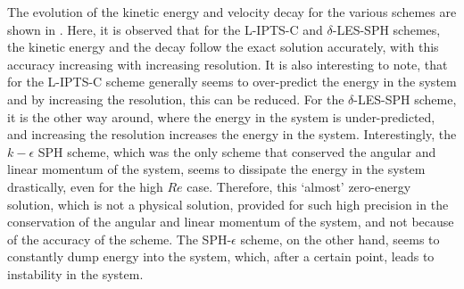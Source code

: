 The evolution of the kinetic energy and velocity decay for the various schemes are shown in . 
Here, it is observed that for the L-IPTS-C and $\delta$-LES-SPH schemes, the kinetic energy and the decay follow the exact solution accurately, with this accuracy increasing with increasing resolution. It is also interesting to note, that for the L-IPTS-C scheme generally seems to over-predict the energy in the system and by increasing the resolution, this can be reduced. For the $\delta$-LES-SPH scheme, it is the other way around, where the energy in the system is under-predicted, and increasing the resolution increases the energy in the system.
Interestingly, the $k-\epsilon$ SPH scheme, which was the only scheme that conserved the angular and linear momentum of the system, seems to dissipate the energy in the system drastically, even for the high $Re$ case. Therefore, this `almost' zero-energy solution, which is not a physical solution, provided for such high precision in the conservation of the angular and linear momentum of the system, and not because of the accuracy of the scheme.
The SPH-$\epsilon$ scheme, on the other hand, seems to constantly dump energy into the system, which, after a certain point, leads to instability in the system.

